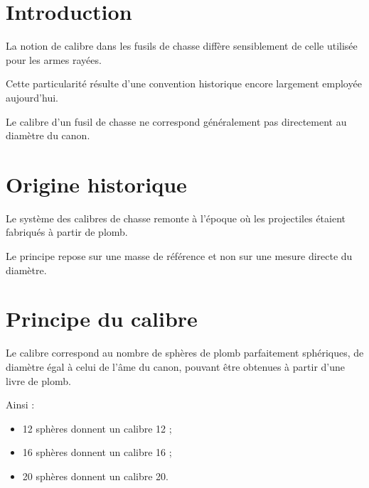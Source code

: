 
\section{Introduction}

La notion de calibre dans les fusils de chasse diffère sensiblement de celle
utilisée pour les armes rayées.

Cette particularité résulte d'une convention historique encore largement
employée aujourd'hui.

\begin{aretenir}

Le calibre d'un fusil de chasse ne correspond généralement pas directement au
diamètre du canon.

\end{aretenir}

\section{Origine historique}

Le système des calibres de chasse remonte à l'époque où les projectiles étaient
fabriqués à partir de plomb.

Le principe repose sur une masse de référence et non sur une mesure directe du
diamètre.

\section{Principe du calibre}

Le calibre correspond au nombre de sphères de plomb parfaitement sphériques,
de diamètre égal à celui de l'âme du canon, pouvant être obtenues à partir
d'une livre de plomb.

Ainsi :

\begin{itemize}
    \item 12 sphères donnent un calibre 12 ;
    \item 16 sphères donnent un calibre 16 ;
    \item 20 sphères donnent un calibre 20.
\end{itemize}

